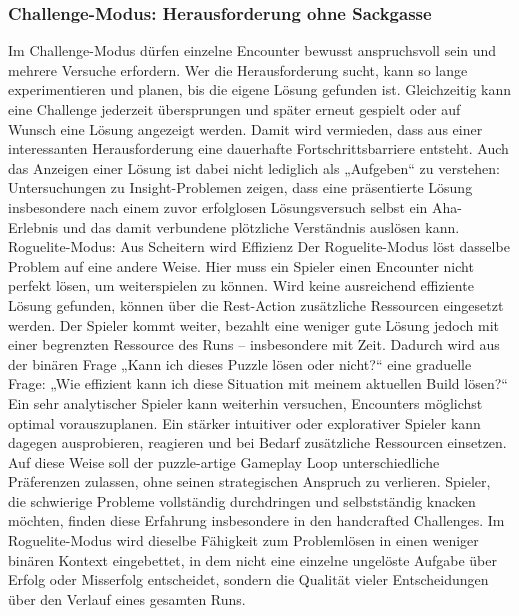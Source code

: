 \subsubsection{Challenge-Modus: Herausforderung ohne Sackgasse}
Im Challenge-Modus dürfen einzelne Encounter bewusst anspruchsvoll sein und mehrere Versuche erfordern. Wer die Herausforderung sucht, kann so lange experimentieren und planen, bis die eigene Lösung gefunden ist. Gleichzeitig kann eine Challenge jederzeit übersprungen und später erneut gespielt oder auf Wunsch eine Lösung angezeigt werden.
Damit wird vermieden, dass aus einer interessanten Herausforderung eine dauerhafte Fortschrittsbarriere entsteht. Auch das Anzeigen einer Lösung ist dabei nicht lediglich als „Aufgeben“ zu verstehen: Untersuchungen zu Insight-Problemen zeigen, dass eine präsentierte Lösung insbesondere nach einem zuvor erfolglosen Lösungsversuch selbst ein Aha-Erlebnis und das damit verbundene plötzliche Verständnis auslösen kann.
Roguelite-Modus: Aus Scheitern wird Effizienz
Der Roguelite-Modus löst dasselbe Problem auf eine andere Weise. Hier muss ein Spieler einen Encounter nicht perfekt lösen, um weiterspielen zu können. Wird keine ausreichend effiziente Lösung gefunden, können über die Rest-Action zusätzliche Ressourcen eingesetzt werden. Der Spieler kommt weiter, bezahlt eine weniger gute Lösung jedoch mit einer begrenzten Ressource des Runs – insbesondere mit Zeit.
Dadurch wird aus der binären Frage „Kann ich dieses Puzzle lösen oder nicht?“ eine graduelle Frage: „Wie effizient kann ich diese Situation mit meinem aktuellen Build lösen?“ Ein sehr analytischer Spieler kann weiterhin versuchen, Encounters möglichst optimal vorauszuplanen. Ein stärker intuitiver oder explorativer Spieler kann dagegen ausprobieren, reagieren und bei Bedarf zusätzliche Ressourcen einsetzen.
Auf diese Weise soll der puzzle-artige Gameplay Loop unterschiedliche Präferenzen zulassen, ohne seinen strategischen Anspruch zu verlieren. Spieler, die schwierige Probleme vollständig durchdringen und selbstständig knacken möchten, finden diese Erfahrung insbesondere in den handcrafted Challenges. Im Roguelite-Modus wird dieselbe Fähigkeit zum Problemlösen in einen weniger binären Kontext eingebettet, in dem nicht eine einzelne ungelöste Aufgabe über Erfolg oder Misserfolg entscheidet, sondern die Qualität vieler Entscheidungen über den Verlauf eines gesamten Runs.

